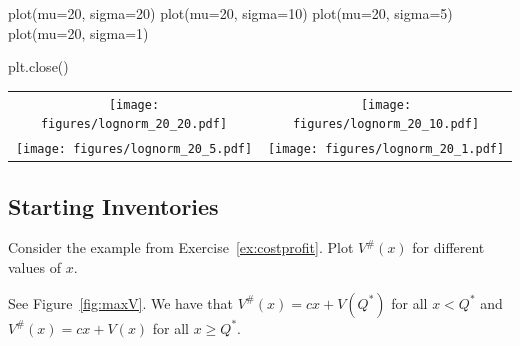 \begin{exercise}
\begin{solution}
\begin{pycode}[news]
plot(mu=20, sigma=20)
plot(mu=20, sigma=10)
plot(mu=20, sigma=5)
plot(mu=20, sigma=1)

plt.close()
\end{pycode}

\begin{center}
  \begin{tabular}[h]{cc}
\texttt{[image: figures/lognorm\_20\_20.pdf]} &
\texttt{[image: figures/lognorm\_20\_10.pdf]} \\
\texttt{[image: figures/lognorm\_20\_5.pdf]} &
\texttt{[image: figures/lognorm\_20\_1.pdf]} \\
  \end{tabular}
\end{center}


\end{solution}
\end{exercise}



\subsection{Starting Inventories}
\label{sec:newsvendor_starting}


\begin{exercise}
Consider the example from Exercise~\ref{ex:costprofit}. Plot $V^\#(x)$ for different values of $x$. 


\begin{solution}
See Figure~\ref{fig:maxV}.  We have that $V^\#(x)=cx+V(Q^*)$ for all $x<Q^*$ and $V^\#(x)=cx+V(x)$ for all $x\geq Q^*$.
\end{solution}
\end{exercise}

